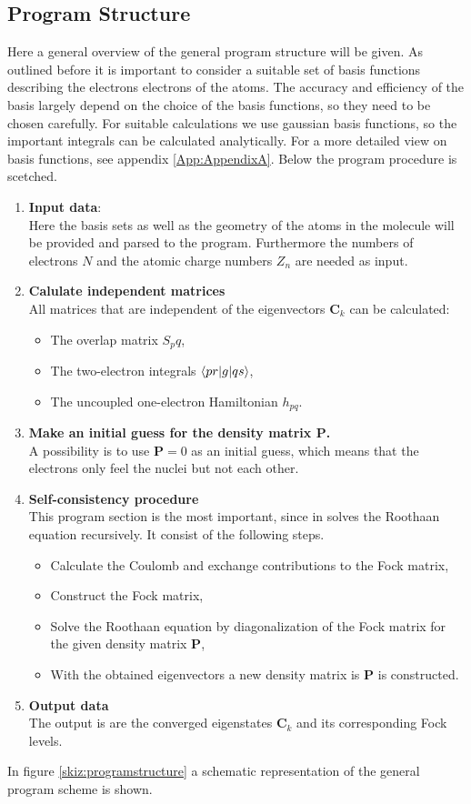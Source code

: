 \documentclass[twoside,        %
			   12pt,			%
               BCOR10mm,       %
               ngerman,english  %
               ]{scrartcl}
\begin{document}
\subsection{Program Structure}
Here a general overview of the general program structure will be given.
As outlined before it is important to consider a suitable set of basis functions describing the electrons electrons of the atoms. The accuracy and efficiency of the basis largely depend on the choice of the basis functions, so they need to be chosen carefully. For suitable calculations we use gaussian basis functions, so the important integrals can be calculated analytically. For a more detailed view on basis functions, see appendix \ref{App:AppendixA}.
Below the program procedure is scetched.
\begin{enumerate}
	\item \textbf{Input data}:\\
	Here the basis sets as well as the geometry of the atoms in the molecule will be provided and parsed to the program. Furthermore the numbers of electrons $N$ and the atomic charge numbers $Z_n$ are needed as input.
	\item \textbf{Calulate independent matrices}\\
	All matrices that are independent of the eigenvectors $\mathbf{C}_k$ can be calculated:
	\begin{itemize}
		\item The overlap matrix $S_pq$,
		\item The two-electron integrals $\braket{pr|g|qs}$,
		\item The uncoupled one-electron Hamiltonian $h_{pq}$.
	\end{itemize}
	\item \textbf{Make an initial guess for the density matrix $\mathbf{P}$.}\\
	A possibility is to use $\mathbf{P} = 0$ as an initial guess, which means that the electrons only feel the nuclei but not each other.
	\item \textbf{Self-consistency procedure}\\
	This program section is the most important, since in solves the Roothaan equation recursively. It consist of the following steps.
	\begin{itemize}
		\item Calculate the Coulomb and exchange contributions to the Fock matrix,
		\item Construct the Fock matrix,
		\item Solve the Roothaan equation by diagonalization of the Fock matrix for the given density matrix $\mathbf{P}$,
		\item With the obtained eigenvectors a new density matrix is $\mathbf{P}$ is constructed.
	\end{itemize}
	\item \textbf{Output data}\\
	The output is are the converged eigenstates $\mathbf{C}_k$ and its corresponding Fock levels.
\end{enumerate}
In figure \ref{skiz:programstructure} a schematic representation of the general program scheme is shown.
    
\end{document}
